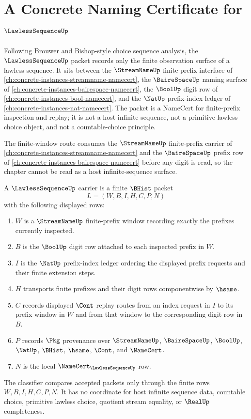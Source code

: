 \chapter{A Concrete Naming Certificate for $\LawlessSequenceUp$}
\label{ch:concrete-instances-lawlesssequence-namecert}

Following Brouwer and Bishop-style choice sequence analysis, the $\LawlessSequenceUp$ packet records only the finite observation surface of a lawless sequence. It sits between the $\StreamNameUp$ finite-prefix interface of \autoref{ch:concrete-instances-streamname-namecert}, the $\BaireSpaceUp$ naming surface of \autoref{ch:concrete-instances-bairespace-namecert}, the $\BoolUp$ digit row of \autoref{ch:concrete-instances-bool-namecert}, and the $\NatUp$ prefix-index ledger of \autoref{ch:concrete-instances-nat-namecert}. The packet is a NameCert for finite-prefix inspection and replay; it is not a host infinite sequence, not a primitive lawless choice object, and not a countable-choice principle.

The finite-window route consumes the $\StreamNameUp$ finite-prefix carrier of \autoref{ch:concrete-instances-streamname-namecert} and the $\BaireSpaceUp$ prefix row of \autoref{ch:concrete-instances-bairespace-namecert} before any digit is read, so the chapter cannot be read as a host infinite-sequence surface.

\begin{definition}
\label{def:lawless-sequence-carrier}
A $\LawlessSequenceUp$ carrier is a finite $\BHist$ packet
$$
L=(W,B,I,H,C,P,N)
$$
with the following displayed rows:
\begin{enumerate}
\item $W$ is a $\StreamNameUp$ finite-prefix window recording exactly the prefixes currently inspected.
\item $B$ is the $\BoolUp$ digit row attached to each inspected prefix in $W$.
\item $I$ is the $\NatUp$ prefix-index ledger ordering the displayed prefix requests and their finite extension steps.
\item $H$ transports finite prefixes and their digit rows componentwise by $\hsame$.
\item $C$ records displayed $\Cont$ replay routes from an index request in $I$ to its prefix window in $W$ and from that window to the corresponding digit row in $B$.
\item $P$ records $\Pkg$ provenance over $\StreamNameUp$, $\BaireSpaceUp$, $\BoolUp$, $\NatUp$, $\BHist$, $\hsame$, $\Cont$, and $\NameCert$.
\item $N$ is the local $\NameCert_{\LawlessSequenceUp}$ row.
\end{enumerate}
The classifier compares accepted packets only through the finite rows $W,B,I,H,C,P,N$. It has no coordinate for host infinite sequence data, countable choice, primitive lawless choice, quotient stream equality, or $\RealUp$ completeness.
\end{definition}

